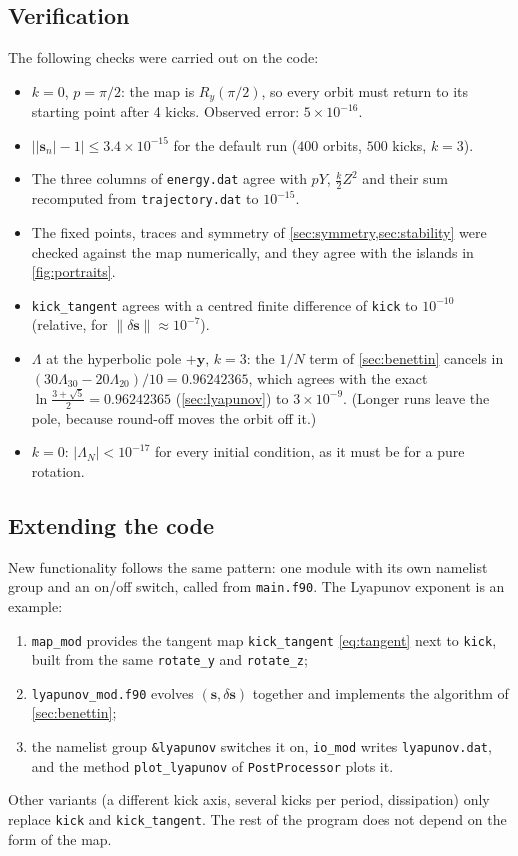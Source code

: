 \documentclass[11pt,a4paper]{article}
\newcommand{\vs}{\bm{s}}
\begin{document}
\subsection{Verification}

The following checks were carried out on the code:
\begin{itemize}
  \item $k = 0$, $p = \pi/2$: the map is $R_y(\pi/2)$, so every orbit must return to its starting point after 4 kicks.
  Observed error: $5\times10^{-16}$.
  \item $\big||\vs_n| - 1\big| \le 3.4\times10^{-15}$ for the default run ($400$ orbits, $500$ kicks, $k=3$).
  \item The three columns of \texttt{energy.dat} agree with $pY$, $\frac k2 Z^2$ and their sum recomputed from
  \texttt{trajectory.dat} to $10^{-15}$.
  \item The fixed points, traces and symmetry of \cref{sec:symmetry,sec:stability} were checked against the map
  numerically, and they agree with the islands in \cref{fig:portraits}.
  \item \texttt{kick\_tangent} agrees with a centred finite difference of \texttt{kick} to $10^{-10}$ (relative, for
  $\|\delta\vs\| \approx 10^{-7}$).
  \item $\Lambda$ at the hyperbolic pole $+\hat{\bm y}$, $k = 3$: the $1/N$ term of \cref{sec:benettin} cancels in
  $(30\Lambda_{30} - 20\Lambda_{20})/10 = 0.96242365$, which agrees with the exact $\ln\frac{3+\sqrt5}{2} =
  0.96242365$ (\cref{sec:lyapunov}) to $3\times10^{-9}$. (Longer runs leave the pole, because round-off moves the orbit
  off it.)
  \item $k = 0$: $|\Lambda_N| < 10^{-17}$ for every initial condition, as it must be for a pure rotation.
\end{itemize}

\subsection{Extending the code}\label{sec:extend}

New functionality follows the same pattern: one module with its own namelist group and an on/off switch, called from
\texttt{main.f90}. The Lyapunov exponent is an example:
\begin{enumerate}
  \item \texttt{map\_mod} provides the tangent map \texttt{kick\_tangent} \eqref{eq:tangent} next to \texttt{kick},
  built from the same \texttt{rotate\_y} and \texttt{rotate\_z};
  \item \texttt{lyapunov\_mod.f90} evolves $(\vs, \delta\vs)$ together and implements the algorithm of
  \cref{sec:benettin};
  \item the namelist group \texttt{\&lyapunov} switches it on, \texttt{io\_mod} writes \texttt{lyapunov.dat}, and the
  method \texttt{plot\_lyapunov} of \texttt{PostProcessor} plots it.
\end{enumerate}
Other variants (a different kick axis, several kicks per period, dissipation) only replace \texttt{kick} and
\texttt{kick\_tangent}. The rest of the program does not depend on the form of the map.
\end{document}
